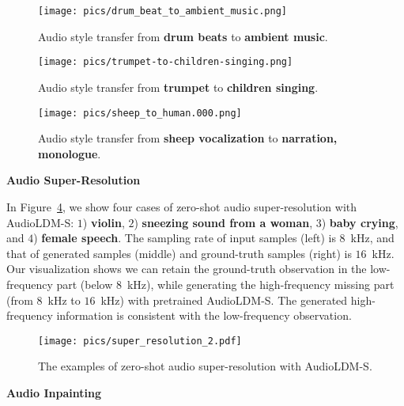 \documentclass{article}
\begin{document}
\vspace{0.5cm}

\begin{figure}[htbp]
    \centering
    \texttt{[image: pics/drum\_beat\_to\_ambient\_music.png]}
    \caption{Audio style transfer from \textbf{drum beats} to \textbf{ambient music}.}
    \label{fig:demo-style-transfer-1}
\end{figure}

\begin{figure}[htbp]
    \centering
    \texttt{[image: pics/trumpet-to-children-singing.png]}
    \caption{Audio style transfer from \textbf{trumpet} to \textbf{children singing}.}
    \label{fig:demo-style-transfer-2}
\end{figure}


\begin{figure}[htbp]
    \centering
    \texttt{[image: pics/sheep\_to\_human.000.png]}
    \caption{Audio style transfer from \textbf{sheep vocalization} to \textbf{narration, monologue}.}
    \label{fig:demo-style-transfer-3}
\end{figure}

\newpage

\textbf{Audio Super-Resolution}

In Figure~\ref{fig:demo-super-resolution}, we show four cases of zero-shot audio super-resolution with AudioLDM-S: $1$) \textbf{violin}, $2$) \textbf{sneezing sound from a woman}, $3$) \textbf{baby crying}, and $4$) \textbf{female speech}. The sampling rate of input samples (left) is $8$~kHz, and that of generated samples (middle) and ground-truth samples (right) is $16$~kHz. Our visualization shows we can retain the ground-truth observation in the low-frequency part (below $8$~kHz), while generating the high-frequency missing part (from $8$~kHz to $16$~kHz) with pretrained AudioLDM-S. The generated high-frequency information is consistent with the low-frequency observation.  

\vspace{0.5cm}

\begin{figure}[htbp]
    \centering
    \texttt{[image: pics/super\_resolution\_2.pdf]}
    \caption{The examples of zero-shot audio super-resolution with AudioLDM-S.}
    \label{fig:demo-super-resolution}
\end{figure}

\newpage

\textbf{Audio Inpainting}
\end{document}
